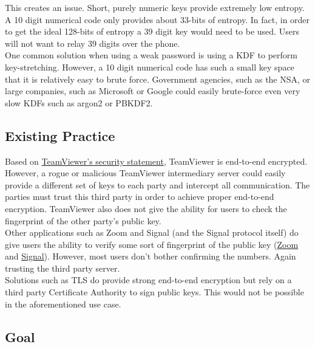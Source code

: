 \documentclass{article}
\begin{document}
    This creates an issue. Short, purely numeric keys provide extremely low entropy.
    A 10 digit numerical code only provides about 33-bits of entropy. In fact, in
    order to get the ideal 128-bits of entropy a 39 digit key would need to be used.
    Users will not want to relay 39 digits over the phone.\\

    One common solution when using a weak password is using a KDF to perform
    key-stretching. However, a 10 digit numerical code has such a small key space
    that it is relatively easy to brute force. Government agencies, such as the NSA,
    or large companies, such as Microsoft or Google could easily brute-force even
    very slow KDFs such as argon2 or PBKDF2.\\

    \subsection{Existing Practice}

    Based on \href{https://static.teamviewer.com/resources/2017/07/TeamViewer-Security-Statement-en.pdf}{TeamViewer's security statement},
    TeamViewer is end-to-end encrypted. However, a rogue or malicious TeamViewer
    intermediary server could easily provide a different set of keys to each party
    and intercept all communication. The parties must trust this third party in
    order to achieve proper end-to-end encryption. TeamViewer also does not give the
    ability for users to check the fingerprint of the other party's public key.\\

    Other applications such as Zoom and Signal (and the Signal protocol itself) do
    give users the ability to verify some sort of fingerprint of the public key
    (\href{https://support.zoom.us/hc/en-us/articles/360048660871-End-to-end-E2EE-encryption-for-meetings#h_01ENGDKFFBKTF796CE03FTCH6J}{Zoom}
    and \href{https://signal.org/blog/safety-number-updates/}{Signal}). However, most
    users don't bother confirming the numbers. Again trusting the third party
    server.\\

    Solutions such as TLS do provide strong end-to-end encryption but rely on a
    third party Certificate Authority to sign public keys. This would not be
    possible in the aforementioned use case.\\

    \subsection{Goal}
\end{document}
